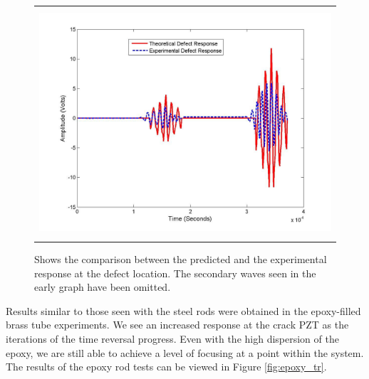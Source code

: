 \documentclass[a4paper]{spie}  %
\begin{document}
\begin{figure}[h!]
\begin{center}
\begin{tabular}{c}
\includegraphics[height=8.5cm]{steel_theory_exp}
\end{tabular}
\end{center}
\caption[example] 
{ \label{fig:steel_theory_exp} 
   Shows the comparison between the predicted and the experimental response at the defect location. The secondary waves seen in the early graph have been omitted.
}
\end{figure} 
   
Results similar to those seen with the steel rods were obtained in the epoxy-filled brass tube experiments. We see an increased response at the crack PZT as the iterations of the time reversal progress. Even with the high dispersion of the epoxy, we are still able to achieve a level of focusing at a point within the system. The results of the epoxy rod tests can be viewed in Figure \ref{fig:epoxy_tr}.
\end{document}
